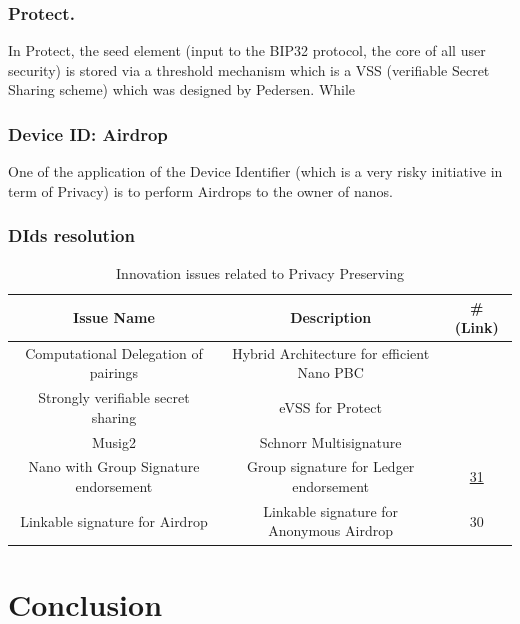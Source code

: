 \documentclass[11pt]{llncs2e/llncs}
\begin{document}
\subsubsection{Protect.} In Protect, the seed element (input to the BIP32 protocol, the core of all user security) is stored via a threshold mechanism which is a VSS (verifiable Secret Sharing scheme) which was designed by Pedersen. While 

\subsubsection{Device ID: Airdrop} One of the application of the Device Identifier (which is a very risky initiative in term of Privacy) is to perform Airdrops to the owner of nanos. 

\subsubsection{DIds resolution}


\begin{table}
 \begin{center}
  \begin{tabular}{|c|c|c|}
   \hline
   Issue Name & Description & \# (Link) \\
   \hline
   Computational Delegation of pairings & Hybrid Architecture for efficient Nano PBC&\\
   \hline
   Strongly verifiable secret sharing& eVSS for Protect &\\
   \hline
   Musig2 &  Schnorr Multisignature& \\
   \hline
   Nano with Group Signature endorsement &  Group signature for Ledger endorsement& \href{https://github.com/LedgerHQ/innovation/issues/31}{31}\\
   \hline
   Linkable signature for Airdrop & Linkable signature for Anonymous Airdrop& 30 \\
   \hline
   
  \end{tabular}

 \end{center}
\caption{Innovation issues related to Privacy Preserving}
\end{table}

\section{Conclusion} 
\end{document}
